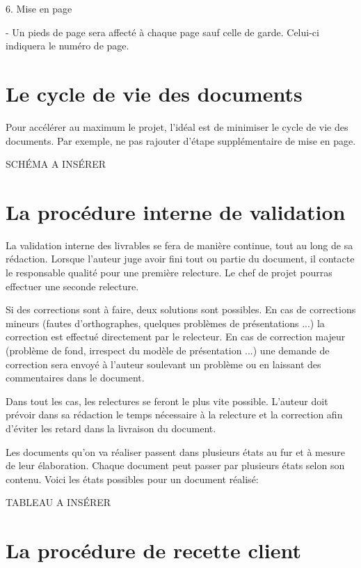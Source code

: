 6. Mise en page

   - Un pieds de page sera affecté à chaque page sauf celle de garde.
     Celui-ci indiquera le numéro de page.

\section{Le cycle de vie des documents}

Pour accélérer au maximum le projet, l’idéal est de minimiser le cycle de vie des documents.
Par exemple, ne pas rajouter d’étape supplémentaire de mise en page.

SCHÉMA A INSÉRER %


\section{La procédure interne de validation}

La validation interne des livrables se fera de manière continue, tout au long de sa rédaction.
Lorsque l’auteur juge avoir fini tout ou partie du document, il contacte le responsable qualité pour une première relecture. Le chef de projet pourras effectuer une seconde relecture.

Si des corrections sont à faire, deux solutions sont possibles.
En cas de corrections mineurs (fautes d’orthographes, quelques problèmes de présentations ...) la correction est effectué directement par le relecteur.
En cas de correction majeur (problème de fond, irrespect du modèle de présentation ...) une demande de correction sera envoyé à l’auteur soulevant un problème ou en laissant des commentaires dans le document.

Dans tout les cas, les relectures se feront le plus vite possible.
L’auteur doit prévoir dans sa rédaction le temps nécessaire à la relecture et la correction afin d’éviter les retard dans la livraison du document.

Les documents qu'on va réaliser passent dans plusieurs états au fur et à mesure de leur élaboration. Chaque document peut passer par plusieurs états selon son contenu. Voici les états possibles pour un document réalisé:

TABLEAU A INSÉRER %


\section{La procédure de recette client}

